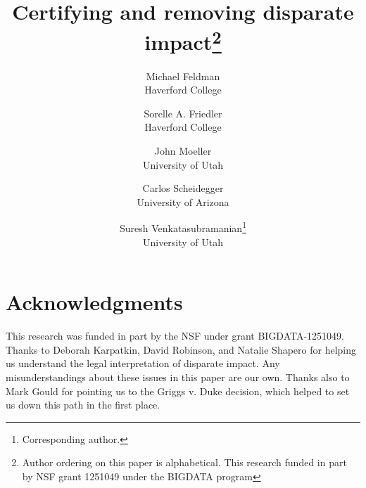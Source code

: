 \documentclass[11pt]{paper}
\title{Certifying and removing disparate impact\thanks{Author ordering on this paper is alphabetical.  This research funded in part by NSF grant 1251049 under the BIGDATA program}}
\author{Michael Feldman\\Haverford College \and Sorelle A. Friedler\\Haverford College \and John Moeller\\University of Utah \and Carlos
  Scheidegger\\University of Arizona \and Suresh
  Venkatasubramanian\thanks{Corresponding author.}\\University of Utah}
\begin{document}
\maketitle















\section{Acknowledgments}

This research was funded in part by the  NSF under grant BIGDATA-1251049. Thanks to Deborah Karpatkin, David Robinson, and Natalie Shapero for helping us understand the legal interpretation of disparate impact.  Any misunderstandings about these issues in this paper are our own.  Thanks also to Mark Gould for pointing us to the Griggs v. Duke decision, which helped to set us down this path in the first place.





\end{document}
